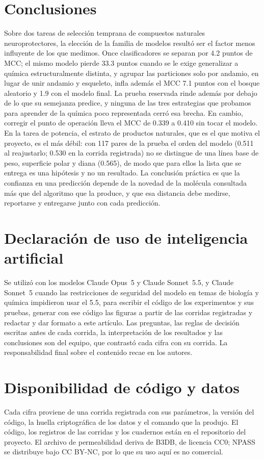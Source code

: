 \documentclass[twocolumn,10pt,letterpaper]{article}
\begin{document}
\section{Conclusiones}

Sobre dos tareas de selección temprana de compuestos naturales neuroprotectores, la elección de la familia de modelos resultó ser el factor menos influyente de los que medimos. Once clasificadores se separan por 4.2 puntos de MCC; el mismo modelo pierde 33.3 puntos cuando se le exige generalizar a química estructuralmente distinta, y agrupar las particiones solo por andamio, en lugar de unir andamio y esqueleto, infla además el MCC 7.1 puntos con el bosque aleatorio y 1.9 con el modelo final. La prueba reservada rinde además por debajo de lo que su semejanza predice, y ninguna de las tres estrategias que probamos para aprender de la química poco representada cerró esa brecha. En cambio, corregir el punto de operación lleva el MCC de 0.339 a 0.410 sin tocar el modelo. En la tarea de potencia, el estrato de productos naturales, que es el que motiva el proyecto, es el más débil: con 117 pares de la prueba el orden del modelo (0.511 al reajustarlo; 0.530 en la corrida registrada) no se distingue de una línea base de peso, superficie polar y diana (0.565), de modo que para ellos la lista que se entrega es una hipótesis y no un resultado. La conclusión práctica es que la confianza en una predicción depende de la novedad de la molécula consultada más que del algoritmo que la produce, y que esa distancia debe medirse, reportarse y entregarse junto con cada predicción.

\section*{Declaración de uso de inteligencia artificial}

Se utilizó \textcite{anthropic2026claude} con los modelos Claude Opus~5 y Claude Sonnet~5.5, y Claude Sonnet~5 cuando las restricciones de seguridad del modelo en temas de biología y química impidieron usar el 5.5, para escribir el código de los experimentos y sus pruebas, generar con ese código las figuras a partir de las corridas registradas y redactar y dar formato a este artículo. Las preguntas, las reglas de decisión escritas antes de cada corrida, la interpretación de los resultados y las conclusiones son del equipo, que contrastó cada cifra con su corrida. La responsabilidad final sobre el contenido recae en los autores.

\section*{Disponibilidad de código y datos}

Cada cifra proviene de una corrida registrada con sus parámetros, la versión del código, la huella criptográfica de los datos y el comando que la produjo. El código, los registros de las corridas y los cuadernos están en el repositorio del proyecto. El archivo de permeabilidad deriva de B3DB, de licencia CC0; NPASS se distribuye bajo CC BY-NC, por lo que su uso aquí es no comercial.

\printbibliography[title={Referencias}]
\end{document}
